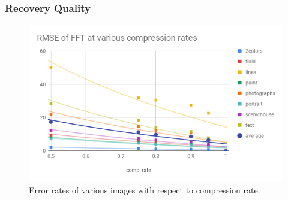	\subsubsection{Recovery Quality}
		\begin{figure}[h]
			\includegraphics[width=\linewidth]{images/comprate-accuracy.png}
			\caption{Error rates of various images with respect to compression rate.}
			\label{fig:rmse-accuracy}
		\end{figure}

